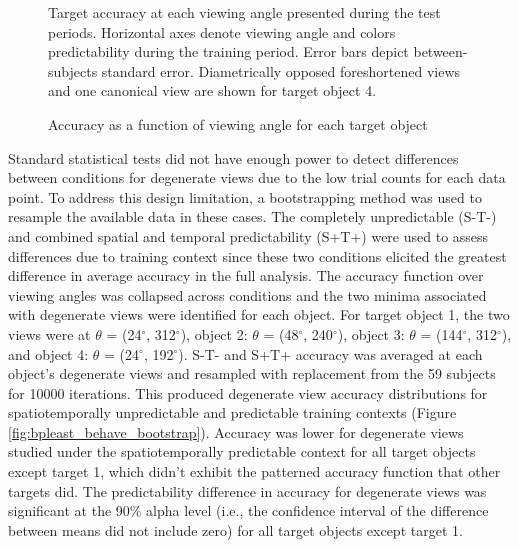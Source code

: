 \documentclass[dwyatte_dissertation.tex]{subfiles}
\begin{document}
\begin{figure}[h!]
\begin{center}
\begin{tabular}{ll}
\end{tabular}
\end{center}
\caption{Accuracy as a function of viewing angle for each target object}{Target accuracy at each viewing angle presented during the test periods. Horizontal axes denote viewing angle and colors predictability during the training period. Error bars depict between-subjects standard error. Diametrically opposed foreshortened views and one canonical view are shown for target object 4.}
\label{fig:bpleast_behave_rot}
\end{figure}

Standard statistical tests did not have enough power to detect differences between conditions for degenerate views due to the low trial counts for each data point. To address this design limitation, a bootstrapping method was used to resample the available data in these cases. The completely unpredictable (S-T-) and combined spatial and temporal predictability (S+T+) were used to assess differences due to training context since these two conditions elicited the greatest difference in average accuracy in the full analysis. The accuracy function over viewing angles was collapsed across conditions and the two minima associated with degenerate views were identified for each object. For target object 1, the two views were at $\theta$ = (24$^\circ$, 312$^\circ$), object 2: $\theta$ = (48$^\circ$, 240$^\circ$), object 3: $\theta$ = (144$^\circ$, 312$^\circ$), and object 4: $\theta$ = (24$^\circ$, 192$^\circ$). S-T- and S+T+ accuracy was averaged at each object's degenerate views and resampled with replacement from the 59 subjects for 10000 iterations. This produced degenerate view accuracy distributions for spatiotemporally unpredictable and predictable training contexts (Figure \ref{fig:bpleast_behave_bootstrap}). Accuracy was lower for degenerate views studied under the spatiotemporally predictable context for all target objects except target 1, which didn't exhibit the patterned accuracy function that other targets did. The predictability difference in accuracy for degenerate views was significant at the 90\% alpha level (i.e., the confidence interval of the difference between means did not include zero) for all target objects except target 1.
\end{document}
